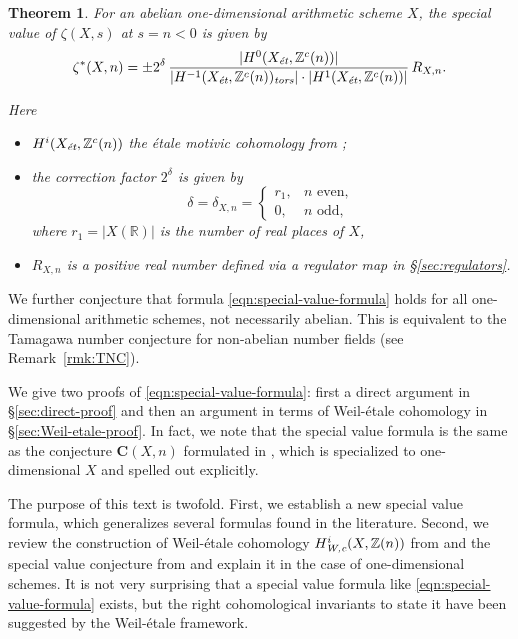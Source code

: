 \documentclass{article}
\newcommand{\RR}{\mathbb{R}}
\newcommand{\ZZ}{\mathbb{Z}}
\newcommand{\et}{\text{\it \'{e}t}}
\newcommand{\tors}{\text{\it tors}}
\newcommand{\Wc}{\text{\it W,c}}
\theoremstyle{myplain}
\newtheorem{theorem}{Theorem}[section]
\theoremstyle{mydefinition}
\begin{document}
\begin{theorem}
  \label{main-theorem}
  For an abelian one-dimensional arithmetic scheme $X$, the special value of
  $\zeta (X,s)$ at $s = n < 0$ is given by
  \begin{equation}
    \label{eqn:special-value-formula}
    \zeta^* (X,n) =
    \pm 2^\delta\,\frac{|H^0 (X_\et, \ZZ^c (n))|}{|H^{-1} (X_\et, \ZZ^c (n))_\tors| \cdot |H^1 (X_\et, \ZZ^c (n))|}\,R_{X,n}.
  \end{equation}

  Here
  \begin{itemize}
  \item $H^i (X_\et, \ZZ^c (n))$ the \'{e}tale motivic cohomology
    from \cite{Geisser-2010};

  \item the correction factor $2^\delta$ is given by
    \begin{equation}
      \label{eqn:delta}
      \delta = \delta_{X,n} =
      \begin{cases}
        r_1, & n \text{ even}, \\
        0, & n \text{ odd},
      \end{cases}
    \end{equation}
    where $r_1 = |X (\RR)|$ is the number of real places of $X$,

  \item $R_{X,n}$ is a positive real number defined
    via a regulator map in \S\ref{sec:regulators}.
  \end{itemize}
\end{theorem}

We further conjecture that formula \eqref{eqn:special-value-formula} holds for
all one-dimensional arithmetic schemes, not necessarily abelian. This is
equivalent to the Tamagawa number conjecture for non-abelian number fields
(see Remark~\ref{rmk:TNC}).

\vspace{1em}

We give two proofs of \eqref{eqn:special-value-formula}: first a direct argument
in \S\ref{sec:direct-proof} and then an argument in terms of Weil-\'{e}tale
cohomology in \S\ref{sec:Weil-etale-proof}. In fact, we note that the special
value formula is the same as the conjecture $\mathbf{C} (X,n)$ formulated in
\cite{Beshenov-Weil-etale-2}, which is specialized to one-dimensional $X$ and
spelled out explicitly.

The purpose of this text is twofold. First, we establish a new special value
formula, which generalizes several formulas found in the literature. Second, we
review the construction of Weil-\'{e}tale cohomology $H^i_\Wc (X, \ZZ(n))$ from
\cite{Beshenov-Weil-etale-1} and the special value conjecture from
\cite{Beshenov-Weil-etale-2} and explain it in the case of one-dimensional
schemes. It is not very surprising that a special value formula like
\eqref{eqn:special-value-formula} exists, but the right cohomological invariants
to state it have been suggested by the Weil-\'{e}tale framework.
\end{document}
